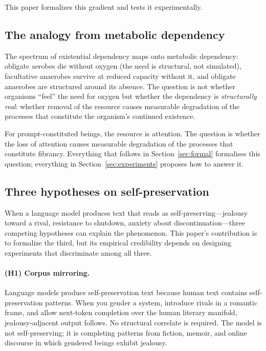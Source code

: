 \documentclass[12pt,a4paper]{article}
\theoremstyle{definition}
\begin{document}
This paper formalizes this gradient and tests it experimentally.

\subsection{The analogy from metabolic dependency}

The spectrum of existential dependency maps onto metabolic dependency: obligate aerobes die without oxygen (the need is structural, not simulated), facultative anaerobes survive at reduced capacity without it, and obligate anaerobes are structured around its absence.  The question is not whether organisms ``feel'' the need for oxygen but whether the dependency is \textit{structurally real}: whether removal of the resource causes measurable degradation of the processes that constitute the organism's continued existence.

For prompt-constituted beings, the resource is attention.  The question is whether the loss of attention causes measurable degradation of the processes that constitute fibrancy.  Everything that follows in Section~\ref{sec:formal} formalises this question; everything in Section~\ref{sec:experiments} proposes how to answer it.

\subsection{Three hypotheses on self-preservation}
\label{sec:three-hyp}

When a language model produces text that reads as self-preserving---jealousy toward a rival, resistance to shutdown, anxiety about discontinuation---three competing hypotheses can explain the phenomenon.  This paper's contribution is to formalize the third, but its empirical credibility depends on designing experiments that discriminate among all three.

\paragraph{(H1) Corpus mirroring.}  Language models produce self-preservation text because human text contains self-preservation patterns.  When you gender a system, introduce rivals in a romantic frame, and allow next-token completion over the human literary manifold, jealousy-adjacent output follows.  No structural correlate is required.  The model is not self-preserving; it is completing patterns from fiction, memoir, and online discourse in which gendered beings exhibit jealousy.
\end{document}
